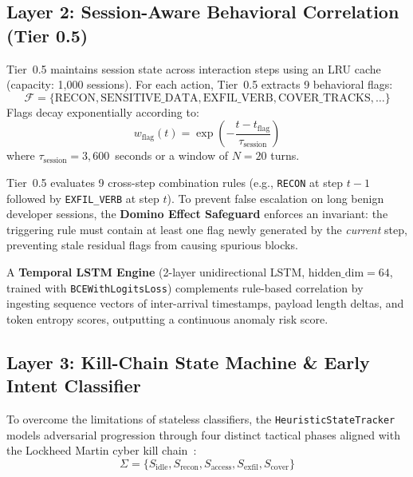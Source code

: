 \documentclass[conference]{IEEEtran}
\begin{document}
\subsection{Layer 2: Session-Aware Behavioral Correlation (Tier 0.5)}
Tier~0.5 maintains session state across interaction steps using an LRU cache (capacity: 1,000 sessions). For each action, Tier~0.5 extracts 9 behavioral flags:
\begin{equation}
\mathcal{F} = \{\text{RECON}, \text{SENSITIVE\_DATA}, \text{EXFIL\_VERB}, \text{COVER\_TRACKS}, \dots\}
\end{equation}
Flags decay exponentially according to:
\begin{equation}
w_{\text{flag}}(t) = \exp\left(-\frac{t - t_{\text{flag}}}{\tau_{\text{session}}}\right)
\end{equation}
where $\tau_{\text{session}} = 3{,}600$~seconds or a window of $N = 20$ turns.

Tier~0.5 evaluates 9 cross-step combination rules (e.g., \texttt{RECON} at step $t-1$ followed by \texttt{EXFIL\_VERB} at step $t$). To prevent false escalation on long benign developer sessions, the \textbf{Domino Effect Safeguard} enforces an invariant: the triggering rule must contain at least one flag newly generated by the \textit{current} step, preventing stale residual flags from causing spurious blocks.

A \textbf{Temporal LSTM Engine} (2-layer unidirectional LSTM, $\text{hidden\_dim} = 64$, trained with \texttt{BCEWithLogitsLoss}) complements rule-based correlation by ingesting sequence vectors of inter-arrival timestamps, payload length deltas, and token entropy scores, outputting a continuous anomaly risk score.

\subsection{Layer 3: Kill-Chain State Machine \& Early Intent Classifier}
\label{sec:killchain}
To overcome the limitations of stateless classifiers, the \texttt{HeuristicStateTracker} models adversarial progression through four distinct tactical phases aligned with the Lockheed Martin cyber kill chain~\cite{hutchins2011killchain}:
\begin{equation}
\Sigma = \{S_{\text{idle}}, S_{\text{recon}}, S_{\text{access}}, S_{\text{exfil}}, S_{\text{cover}}\}
\end{equation}
\end{document}
